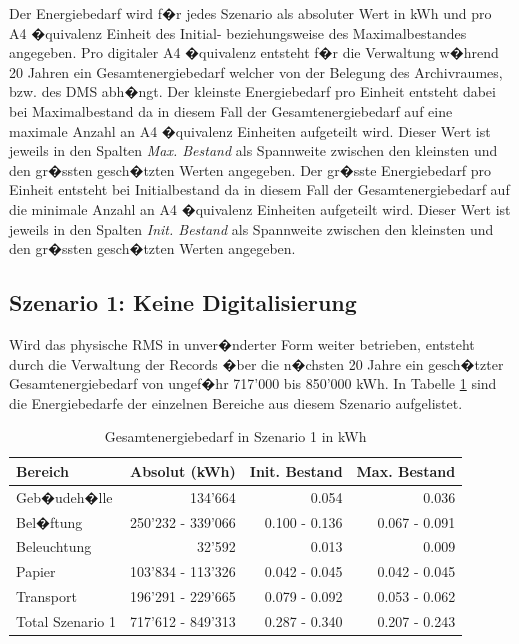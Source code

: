 \documentclass[a4paper,twoside,10pt]{report}
\begin{document}
Der Energiebedarf wird f�r jedes Szenario als absoluter Wert in kWh und pro A4 �quivalenz Einheit des Initial- beziehungsweise des Maximalbestandes angegeben. Pro digitaler A4 �quivalenz entsteht f�r die Verwaltung w�hrend 20 Jahren ein Gesamtenergiebedarf welcher von der Belegung des Archivraumes, bzw. des \ac{DMS} abh�ngt. Der kleinste Energiebedarf pro Einheit entsteht dabei bei Maximalbestand da in diesem Fall der Gesamtenergiebedarf auf eine maximale Anzahl an A4 �quivalenz Einheiten aufgeteilt wird. Dieser Wert ist jeweils in den Spalten \emph{Max. Bestand} als Spannweite zwischen den kleinsten und den gr�ssten gesch�tzten Werten angegeben. Der gr�sste Energiebedarf pro Einheit entsteht bei Initialbestand da in diesem Fall der Gesamtenergiebedarf auf die minimale Anzahl an A4 �quivalenz Einheiten aufgeteilt wird. Dieser Wert ist jeweils in den Spalten \emph{Init. Bestand} als Spannweite zwischen den kleinsten und den gr�ssten gesch�tzten Werten angegeben.

\subsection{Szenario 1: Keine Digitalisierung}
Wird das physische \ac{RMS} in unver�nderter Form weiter betrieben, entsteht durch die Verwaltung der Records �ber die n�chsten 20 Jahre ein gesch�tzter Gesamtenergiebedarf von ungef�hr 717'000 bis 850'000 kWh. In Tabelle \ref{tab:ges_energ_szen1} sind die Energiebedarfe der einzelnen Bereiche aus diesem Szenario aufgelistet. 

\begin{table} [h]
	\begin{tabular}{l|r|r|r}
	\hline
	\textbf{Bereich} & \textbf{Absolut (kWh)} & \textbf{Init. Bestand} & \textbf{Max. Bestand}\\
	\hline
	Geb�udeh�lle 	& 134'664 					& 0.054 				& 0.036\\
	Bel�ftung			&	250'232 - 339'066 & 0.100 - 0.136 & 0.067 - 0.091\\
	Beleuchtung	 	& 32'592 						& 0.013 & 0.009	\\
	Papier 				& 103'834 - 113'326 & 0.042 - 0.045 & 0.042 - 0.045\\
	Transport 		& 196'291 - 229'665 & 0.079 - 0.092 & 0.053 - 0.062 \\
	\hline
	\hline
	Total Szenario 1 & 717'612 - 849'313 &0.287 - 0.340 & 0.207 - 0.243\\
	\hline
	\end{tabular}
\caption{Gesamtenergiebedarf in Szenario 1 in kWh} 
\label{tab:ges_energ_szen1}
\end{table}
\end{document}
